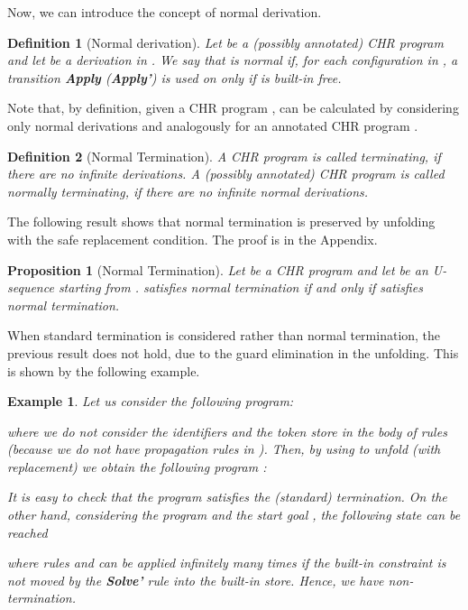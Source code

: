 \documentclass{tlp}
\newtheorem{definition}{Definition} \newtheorem{proposition}{Proposition} \newtheorem{example}{Example} \newtheorem{corollary}{Corollary} \newtheorem{theorem}{Theorem} \newtheorem{lemma}{Lemma}
\begin{document}
Now, we can introduce the concept of normal derivation.

\begin{definition}[{\sc Normal derivation}]\label{def:ND}
Let   be a (possibly annotated) CHR program  and let
 be a derivation in .
We say that  is normal if, for each configuration   in , a transition
\textbf{Apply} (\textbf{Apply'})
is used on  only if  is built-in free.
\end{definition}


Note that, by definition, given a CHR program ,  can be calculated by considering only normal derivations and analogously for an annotated CHR program .

\begin{definition}[{\sc Normal Termination}]
A CHR program  is called \emph{terminating}, if there are no infinite derivations.
A (possibly annotated) CHR program  is called  \emph{normally terminating}, if there are no infinite normal derivations.
\end{definition}

The following result shows that normal termination is preserved by unfolding with the safe replacement condition. The proof is in the Appendix.


\begin{proposition}[{\sc Normal Termination}]\label{prop:termination} Let  be a CHR program and
let  be an U-sequence starting from .  satisfies
normal termination if and only if   satisfies normal termination.
\end{proposition}

When standard termination is considered  rather than  normal termination,
the previous result does not hold, due to  the guard elimination in the unfolding. This is shown by the following example.

\begin{example}\label{ex:termination-problem}
Let us consider the following program:

where we do not consider the identifiers and the token store in the
body of rules (because we do not have propagation rules in ).
Then, by using  to unfold  (with replacement) we obtain the following program :

It is easy to check that the program  satisfies the (standard) termination.
On the other hand, considering the program  and the start goal , the following state can be reached

where rules  and  can be applied infinitely many times if the built-in constraint  is not moved by the \textbf{Solve'} rule into the built-in store. Hence, we have non-termination.\end{example}
\end{document}
